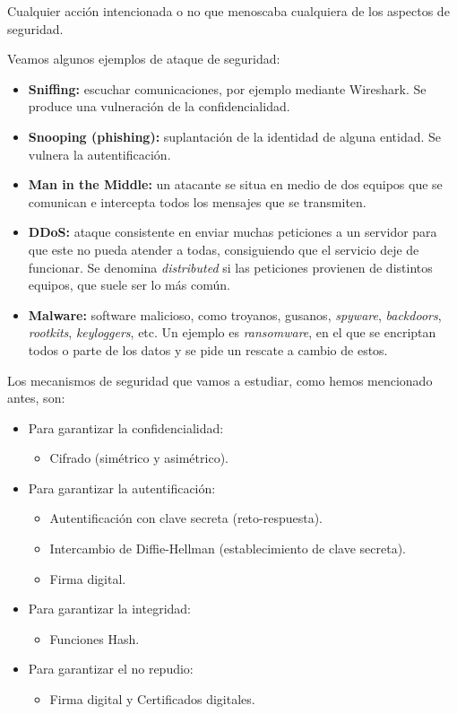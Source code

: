 \begin{definicion}
    Cualquier acción intencionada o no que menoscaba cualquiera de los aspectos de seguridad. 
\end{definicion}

Veamos algunos ejemplos de ataque de seguridad:
\begin{itemize}
    \item \textbf{Sniffing:} escuchar comunicaciones, por ejemplo mediante Wireshark. Se produce una vulneración de la confidencialidad.
    \item \textbf{Snooping (phishing):} suplantación de la identidad de alguna entidad. Se vulnera la autentificación.
    \item \textbf{Man in the Middle:} un atacante se situa en medio de dos equipos que se comunican e intercepta todos los mensajes que se transmiten.
    \item \textbf{\acrfull{DDoS}:} ataque consistente en enviar muchas peticiones a un servidor para que este no pueda atender a todas, consiguiendo que el servicio deje de funcionar. Se denomina \emph{distributed} si las peticiones provienen de distintos equipos, que suele ser lo más común. 
    \item \textbf{Malware:} software malicioso, como troyanos, gusanos, \textit{spyware}, \textit{backdoors}, \textit{rootkits}, \textit{keyloggers}, etc. Un ejemplo es \textit{ransomware}, en el que se encriptan todos o parte de los datos y se pide un rescate a cambio de estos.
\end{itemize}


Los mecanismos de seguridad que vamos a estudiar, como hemos mencionado antes, son:
\begin{itemize}
    \item Para garantizar la confidencialidad:
    \begin{itemize}
        \item Cifrado (simétrico y asimétrico).
    \end{itemize}
    \item Para garantizar la autentificación:
    \begin{itemize}
        \item Autentificación con clave secreta (reto-respuesta).
        \item Intercambio de Diffie-Hellman (establecimiento de clave secreta).
        \item Firma digital.
    \end{itemize}

    \item Para garantizar la integridad:
    \begin{itemize}
        \item Funciones Hash.
    \end{itemize}

    \item Para garantizar el no repudio:
    \begin{itemize}
        \item Firma digital y Certificados digitales.
    \end{itemize}
\end{itemize}

